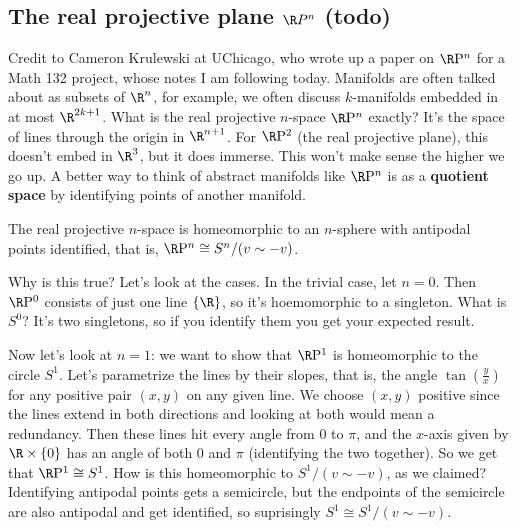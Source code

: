 \subsection{The real projective plane $\R \mathrm \mathrm P^n$ (todo)}
Credit to Cameron Krulewski at UChicago, who wrote up a paper on $\R \mathrm P^n$ for a Math 132 project, whose notes I am following today.
\orbreak
Manifolds are often talked about as subsets of $\R^n$, for example, we often discuss $k$-manifolds embedded in at most $\R^{2k+1}$. What is the real projective $n$-space $\R \mathrm P^n$ exactly? It's the space of lines through the origin in $\R^{n+1}$. For $\R \mathrm P^2$ (the real projective plane), this doesn't embed in $\R^3$, but it does immerse. This won't make sense the higher we go up. A better way to think of abstract manifolds like $\R \mathrm P^n$ is as a \textbf{quotient space} by identifying points of another manifold.
\begin{claim}
    The real projective $n$-space is homeomorphic to an $n$-sphere with antipodal points identified, that is, $\R \mathrm P^n \cong S^n/ (v \sim -v)$.
\end{claim}
Why is this true? Let's look at the cases. In the trivial case, let $n=0$. Then $\R \mathrm P^0$ consists of just one line $\{\R\} $, so it's hoemomorphic to a singleton. What is $S^0$? It's two singletons, so if you identify them you get your expected result.

Now let's look at $n=1$: we want to show that $\R \mathrm P^1$ is homeomorphic to the circle $S^{1} $. Let's parametrize the lines by their slopes, that is, the angle $\tan \left( \frac{y}{x} \right) $ for any positive pair $(x,y)$ on any given line. We choose $(x,y)$ positive since the lines extend in both directions and looking at both would mean a redundancy. Then these lines hit every angle from $0$ to $\pi$, and the $x$-axis given by $\R\times \{0\} $ has an angle of both $0$ and $\pi$ (identifying the two together). So we get that $\R \mathrm P^1 \cong S^{1} $. How is this homeomorphic to $S^{1} / (v \sim -v)$, as we claimed? Identifying antipodal points gets a semicircle, but the endpoints of the semicircle are also antipodal and get identified, so suprisingly $S^{1} \cong S^{1} /(v\sim -v)$.






